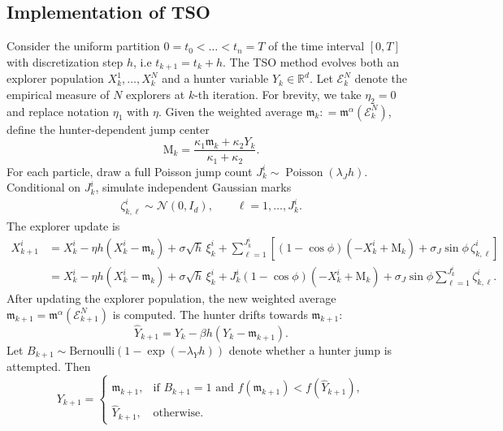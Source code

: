 \documentclass{article}
\def\cE{\mathcal{E}}
\def\m{\mathfrak{m}}
\numberwithin{equation}{section}
\begin{document}
\subsection{Implementation of TSO}\label{tso_sect_implementation}
Consider the uniform partition $0=t_0<\dots<t_n = T$ of the time interval $[0,T]$ with discretization step $h$, i.e $t_{k +1} = t_k + h$. The TSO method evolves both an explorer population $ X_k^1,\dots,X_k^N$ 
and a hunter variable $Y_k\in\mathbb{R}^d$. Let $\cE^N_k$ denote the empirical measure of $N$ explorers at $k$-th iteration. For brevity, we take $\eta_2 = 0 $ and replace notation $\eta_1$ with $\eta$. Given the weighted average $\m_k : = \m^\alpha(\cE^N_k)$, define the hunter-dependent jump center
\begin{equation*}
    \mathrm M_k
    = \frac{
        \kappa_1 \m_k+\kappa_2 Y_k}{\kappa_1+\kappa_2
    }.
\end{equation*}
For each particle, draw a full Poisson jump count $    J_k^i \sim \operatorname{Poisson}(\lambda_J h)$.  Conditional on $J_k^i$, simulate independent Gaussian marks
\begin{align*}
    \zeta_{k,\ell}^i \sim \mathcal{N}(0,I_d),
    \qquad
    \ell=1,\dots,J^i_k.
\end{align*}
The explorer update is
\begin{align}
    X_{k+1}^i
    &=
 X_k^i -
    \eta h\left(X_k^i-\m_k\right) +
    \sigma\sqrt{h}\,\xi_k^i +
    \sum_{\ell=1}^{J_{k}^{i}}
    \left[    (1-\cos\phi)\left(-X_k^i+ \mathrm M_{k}\right)
        +
 \sigma_J\sin\phi\,\zeta_{k,\ell}^i
    \right] \nonumber \\  
    & = X_k^i
    - \eta h\left(X_k^i-\m_k\right)
 +  \sigma\sqrt{h}\,\xi_k^i +
    J_k^i(1-\cos\phi)\left(-X_k^i+\mathrm M_k\right)
    + \sigma_J\sin\phi
    \sum_{\ell=1}^{J_k^i}\zeta_{k,\ell}^i.
\end{align}
After updating the explorer population, the new weighted average $\m_{k+1}=\m^\alpha(\cE^N_{k +1})$
is computed. The hunter drifts towards $\m_{k+1}$:
\begin{equation}
    \hat{Y}_{k+1}
    =  Y_k - \beta h\left(Y_k- \m_{k+1}\right).
\end{equation}
Let $B_{k+1} \sim \mathrm{Bernoulli}(1-\exp(-\lambda_Y h))$ denote whether a hunter jump is attempted. Then
\begin{equation}\label{tso_eqn_5.3}
Y_{k+1} =
\begin{cases}
\m_{k+1},
& \text{if } B_{k+1}=1 \text{ and } f(\m_{k+1})<f(\hat{Y}_{k+1}),\\
\hat{Y}_{k+1},
& \text{otherwise}.
\end{cases}
\end{equation}
\end{document}
